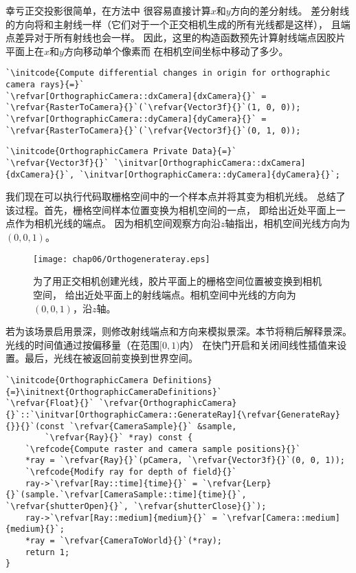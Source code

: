 幸亏正交投影很简单，在方法中
很容易直接计算$x$和$y$方向的差分射线。
差分射线的方向将和主射线一样（它们对于一个正交相机生成的所有光线都是这样），
且端点差异对于所有射线也会一样。
因此，这里的构造函数预先计算射线端点因胶片平面上在$x$和$y$方向移动单个像素而
在相机空间坐标中移动了多少。
\begin{lstlisting}
`\initcode{Compute differential changes in origin for orthographic camera rays}{=}`
`\refvar[OrthographicCamera::dxCamera]{dxCamera}{}` = `\refvar{RasterToCamera}{}`(`\refvar{Vector3f}{}`(1, 0, 0));
`\refvar[OrthographicCamera::dyCamera]{dyCamera}{}` = `\refvar{RasterToCamera}{}`(`\refvar{Vector3f}{}`(0, 1, 0));
\end{lstlisting}
\begin{lstlisting}
`\initcode{OrthographicCamera Private Data}{=}`
`\refvar{Vector3f}{}` `\initvar[OrthographicCamera::dxCamera]{dxCamera}{}`, `\initvar[OrthographicCamera::dyCamera]{dyCamera}{}`;
\end{lstlisting}

我们现在可以执行代码取栅格空间中的一个样本点并将其变为相机光线。
总结了该过程。首先，栅格空间样本位置变换为相机空间的一点，
即给出近处平面上一点作为相机光线的端点。
因为相机空间观察方向沿$z$轴指出，相机空间光线方向为$(0,0,1)$。

\begin{figure}[htbp]
    \centering\texttt{[image: chap06/Orthogenerateray.eps]}
    \caption{为了用正交相机创建光线，胶片平面上的栅格空间位置被变换到相机空间，
        给出近处平面上的射线端点。相机空间中光线的方向为$(0,0,1)$，沿$z$轴。}
    \label{fig:6.4}
\end{figure}

若为该场景启用景深，则修改射线端点和方向来模拟景深。本节将稍后解释景深。
光线的时间值通过按偏移量（在范围$[0,1)$内）
在快门开启和关闭间线性插值来设置。最后，光线在被返回前变换到世界空间。
\begin{lstlisting}
`\initcode{OrthographicCamera Definitions}{=}\initnext{OrthographicCameraDefinitions}`
`\refvar{Float}{}` `\refvar{OrthographicCamera}{}`::`\initvar[OrthographicCamera::GenerateRay]{\refvar{GenerateRay}{}}{}`(const `\refvar{CameraSample}{}` &sample,
        `\refvar{Ray}{}` *ray) const {
    `\refcode{Compute raster and camera sample positions}{}`
    *ray = `\refvar{Ray}{}`(pCamera, `\refvar{Vector3f}{}`(0, 0, 1));
    `\refcode{Modify ray for depth of field}{}`
    ray->`\refvar[Ray::time]{time}{}` = `\refvar{Lerp}{}`(sample.`\refvar[CameraSample::time]{time}{}`, `\refvar{shutterOpen}{}`, `\refvar{shutterClose}{}`);
    ray->`\refvar[Ray::medium]{medium}{}` = `\refvar[Camera::medium]{medium}{}`;
    *ray = `\refvar{CameraToWorld}{}`(*ray);
    return 1;
}
\end{lstlisting}

